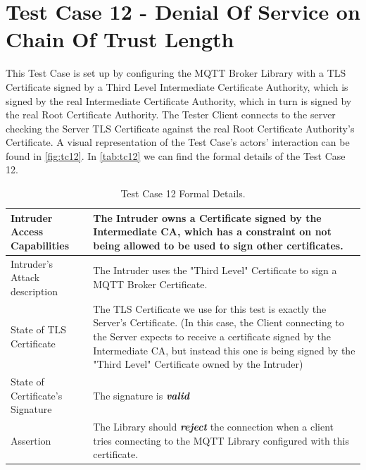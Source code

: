 \documentclass[binding=0.6cm,noexaminfo]{sapthesis}
\begin{document}
\section{Test Case 12 - Denial Of Service on Chain Of Trust Length}
This Test Case is set up by configuring the MQTT Broker Library with a TLS Certificate signed by a Third Level Intermediate Certificate Authority, which is signed by the real Intermediate Certificate Authority, which in turn is signed by the real Root Certificate Authority. The Tester Client connects to the server checking the Server TLS Certificate against the real Root Certificate Authority’s Certificate. A visual representation of the Test Case's actors' interaction can be found in \autoref{fig:tc12}.  In \autoref{tab:tc12} we can find the formal details of the Test Case 12.

\begin{table}
\begin{center}
\begin{tabular}{| p{6cm} | p{6cm} |}
\hline
Intruder Access Capabilities & The Intruder owns a Certificate signed by the Intermediate CA, which has a constraint on not being allowed to be used to sign other certificates. \\
\hline
Intruder’s Attack description & The Intruder uses the "Third Level" Certificate to sign a MQTT Broker Certificate. \\
\hline
State of TLS Certificate & The TLS Certificate we use for this test is exactly the Server’s Certificate. (In this case, the Client connecting to the Server expects to receive a certificate signed by the Intermediate CA, but instead this one is being signed by the "Third Level" Certificate owned by the Intruder) \\
\hline
State of Certificate’s Signature & The signature is \textbf{\textit{valid}} \\
\hline
Assertion & The Library should \textbf{\textit{reject}} the connection when a client tries connecting to the MQTT Library configured with this certificate. \\
\hline
\end{tabular}
\caption{Test Case 12 Formal Details.}
\label{tab:tc12}
\end{center}
\end{table}
\end{document}
